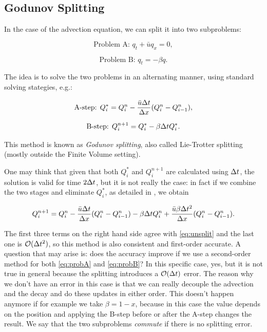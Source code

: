 \documentclass[journal,onecolumn]{IEEEtran}
\begin{document}
\subsection{Godunov Splitting}

In the case of the advection equation, we can split it into two subproblems:

\begin{equation}\label{eq:probA}
	\text{Problem A: } q_t+\bar{u}q_x=0,
\end{equation}

\begin{equation}\label{eq:probB}
	\text{Problem B: } q_t = -\beta q.
\end{equation}

The idea is to solve the two problems in an alternating manner, using standard solving stategies, e.g.:

\begin{equation}\label{eq:stepA}
	\text{A-step: } Q_i^* = Q_i^n - \frac{\bar{u}\Delta t}{\Delta x} (Q_i^n-Q_{i-1}^n),
\end{equation}

\begin{equation}\label{eq:stepB}
	\text{B-step: } Q_i^{n+1} = Q_i^*-\beta\Delta tQ_i^*.
\end{equation}

This method is known as \textit{Godunov splitting}, also called Lie-Trotter splitting (mostly outside the Finite Volume setting).

One may think that given that both $Q_i^*$ and $Q_i^{n+1}$ are calculated using $\Delta t$, the solution is valid for time $2\Delta t$, but it is not really the case: in fact if we combine the two stages and eliminate $Q_i^*$, as detailed in \cite{leveque}, we obtain

\begin{equation}
	Q_i^{n+1} = Q_i^n -\frac{\bar{u}\Delta t}{\Delta x}(Q_i^n-Q_{i-1}^n)-\beta\Delta tQ_i^n +\frac{\bar{u}\beta\Delta t^2}{\Delta x}(Q_i^n-Q_{i-1}^n).
\end{equation}

The first three terms on the right hand side agree with \eqref{eq:unsplit} and the last one is $\mathcal{O}(\Delta t^2)$, so this method is also consistent and first-order accurate. A question that may arise is: does the accuracy improve if we use a second-order method for both \eqref{eq:probA} and \eqref{eq:probB}? In this specific case, yes, but it is not true in general because the splitting introduces a $\mathcal{O}(\Delta t)$ error. The reason why we don't have an error in this case is that we can really decouple the advection and the decay and do these updates in either order. This doesn't happen anymore if for example we take $\beta = 1-x$, because in this case the value depends on the position and applying the B-step before or after the A-step changes the result. We say that the two subproblems \textit{commute} if there is no splitting error.
\end{document}
